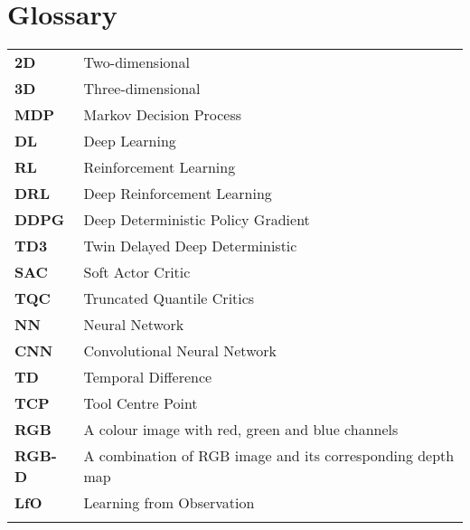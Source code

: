 %
\chapter*{Glossary}

\capstartfalse
\begin{table}[!hb]
    \begin{tabular}{ll}
        \textbf{2D}    & Two-dimensional                                            \\
        \textbf{3D}    & Three-dimensional                                          \\
        \textbf{MDP}   & Markov Decision Process                                    \\
        \textbf{DL}    & Deep Learning                                              \\
        \textbf{RL}    & Reinforcement Learning                                     \\
        \textbf{DRL}   & Deep Reinforcement Learning                                \\
        \textbf{DDPG}  & Deep Deterministic Policy Gradient                         \\
        \textbf{TD3}   & Twin Delayed Deep Deterministic                            \\
        \textbf{SAC}   & Soft Actor Critic                                          \\
        \textbf{TQC}   & Truncated Quantile Critics                                 \\
        \textbf{NN}    & Neural Network                                             \\
        \textbf{CNN}   & Convolutional Neural Network                               \\
        \textbf{TD}    & Temporal Difference                                        \\
        \textbf{TCP}   & Tool Centre Point                                          \\
        \textbf{RGB}   & A colour image with red, green and blue channels           \\
        \textbf{RGB-D} & A combination of RGB image and its corresponding depth map \\
        \textbf{LfO}   & Learning from Observation                                  \\
        \textbf{}      &                                                            \\

\end{tabular}
\end{table}
